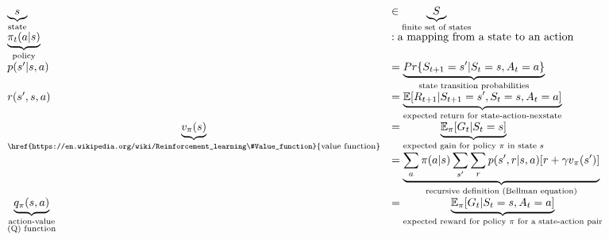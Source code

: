 \documentclass[10pt,landscape]{article}
\begin{document}
\begin{multicols}{3}
\begin{equation}
    \begin{array}{l l}
        \underbrace{s}_\text{state} &\in \underbrace{S}_\text{finite set of states}\\
        \underbrace{\pi_t(a|s)}_\text{policy} &: \text{a mapping from a state to an action}\\
        p(s'|s,a) &= \underbrace{Pr \{S_{t + 1} = s' | S_t=s,A_t=a\}}_\text{state transition probabilities}\\
        r(s',s, a) &= \underbrace{\mathbb{E}[ R_{t + 1} | S_{t + 1}=s',S_t=s,A_t=a]}_\text{expected return for state-action-nexstate}\\
        \underbrace{v_{\pi}(s)}_\text{\href{https://en.wikipedia.org/wiki/Reinforcement_learning\#Value_function}{value function}} &= \underbrace{\mathbb{E}_{\pi}[G_t | S_t = s]}_\text{expected gain for policy $\pi$ in state $s$}\\
        &= \underbrace{\sum\limits_{a} \pi(a | s) \sum\limits_{s'}\sum\limits_{r} p(s', r | s, a)[r + \gamma v_{\pi}(s')]}_\text{recursive definition (Bellman equation)}\\
        \underbrace{q_{\pi}(s,a)}_{\substack{\text{action-value}\\\text{(Q) function}}} &= \underbrace{\mathbb{E}_{\pi}[G_t | S_t = s, A_t = a]}_\text{expected reward for policy $\pi$ for a state-action pair}\\

\end{array}
\end{equation}
\end{multicols}
\end{document}
